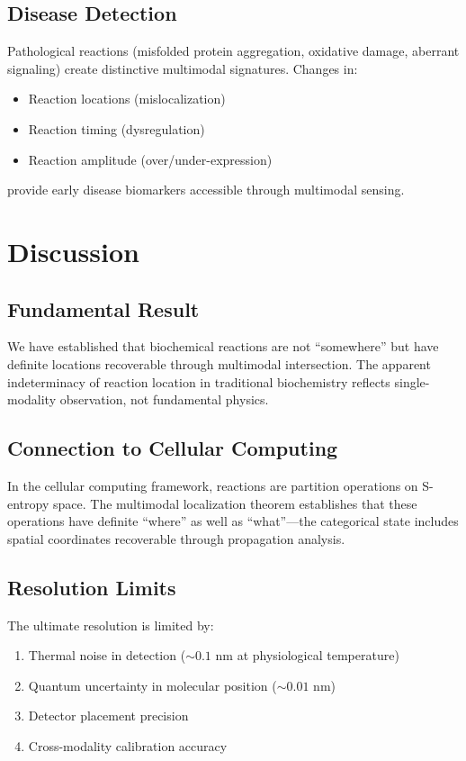 \documentclass[11pt,a4paper]{article}
\theoremstyle{remark}
\begin{document}
\subsection{Disease Detection}

Pathological reactions (misfolded protein aggregation, oxidative damage, aberrant signaling) create distinctive multimodal signatures. Changes in:
\begin{itemize}
    \item Reaction locations (mislocalization)
    \item Reaction timing (dysregulation)
    \item Reaction amplitude (over/under-expression)
\end{itemize}
provide early disease biomarkers accessible through multimodal sensing.

\section{Discussion}

\subsection{Fundamental Result}

We have established that biochemical reactions are not ``somewhere'' but have definite locations recoverable through multimodal intersection. The apparent indeterminacy of reaction location in traditional biochemistry reflects single-modality observation, not fundamental physics.

\subsection{Connection to Cellular Computing}

In the cellular computing framework, reactions are partition operations on S-entropy space. The multimodal localization theorem establishes that these operations have definite ``where'' as well as ``what''---the categorical state includes spatial coordinates recoverable through propagation analysis.

\subsection{Resolution Limits}

The ultimate resolution is limited by:
\begin{enumerate}
    \item Thermal noise in detection ($\sim 0.1$ nm at physiological temperature)
    \item Quantum uncertainty in molecular position ($\sim 0.01$ nm)
    \item Detector placement precision
    \item Cross-modality calibration accuracy
\end{enumerate}
\end{document}
